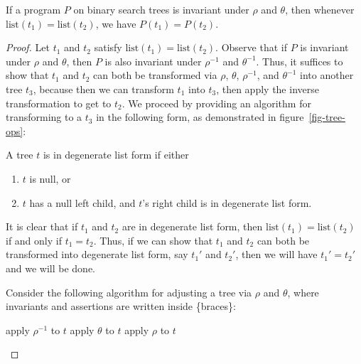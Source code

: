 \documentclass{llncs}
\begin{document}
  \begin{theorem}
    If a program $P$ on binary search trees is invariant under $\rho$
    and $\theta$, then whenever $\mathrm{list}(t_1) = \mathrm{list}(t_2)$,
    we have $P(t_1) = P(t_2)$.
  \end{theorem}
  \begin{proof}
    Let $t_1$ and $t_2$ satisfy $\mathrm{list}(t_1) = \mathrm{list}(t_2)$.
    Observe that if $P$ is invariant under $\rho$ and $\theta$,
    then $P$ is also invariant under $\rho^{-1}$ and $\theta^{-1}$.
    Thus, it suffices to show that $t_1$ and $t_2$ can both be transformed
    via $\rho$, $\theta$, $\rho^{-1}$, and $\theta^{-1}$ into another tree $t_3$,
    because then we can transform $t_1$ into $t_3$, then apply the inverse
    transformation to get to $t_2$.
    We proceed by providing an algorithm for transforming to a $t_3$
    in the following form, as demonstrated in
    figure~\ref{fig-tree-ops}:

    \begin{definition}
      A tree $t$ is in degenerate list form if either
      \begin{enumerate}
        \item $t$ is null, or
        \item $t$ has a null left child, and $t$'s right child is in degenerate
          list form.
      \end{enumerate}
    \end{definition}

    It is clear that if $t_1$ and $t_2$ are in degenerate list form, then
    $\mathrm{list}(t_1) = \mathrm{list}(t_2)$ if and only if $t_1 = t_2$.
    Thus, if we can show that $t_1$ and $t_2$ can both be transformed into
    degenerate list form, say $t_1'$ and $t_2'$, then we will have $t_1' = t_2'$
    and we will be done.

    Consider the following algorithm for adjusting a tree via $\rho$ and $\theta$,
    where invariants and assertions are written inside \{braces\}:

    \vspace{-0.2in}
    \begin{algorithm}
      \begin{algorithmic}[1]
            \State apply $\rho^{-1}$ to $t$
          \EndWhile
           \label{null-right}
            \label{inner-loop}
              \State apply $\theta$ to $t$
            \EndWhile
              \label{null-left-right}
            \State apply $\rho$ to $t$ \label{apply-rho}
          \EndWhile
           \label{postcond}
        \EndFunction
      \end{algorithmic}
    \end{algorithm} 
    \vspace{-0.1in}


\end{proof}
\end{document}
